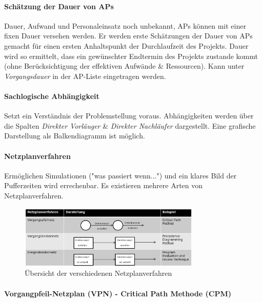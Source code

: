 \documentclass[a4paper]{article}
\begin{document}
			\paragraph{Schätzung der Dauer von APs}
			
			Dauer, Aufwand und Personaleinsatz noch unbekannt, APs können mit einer fixen Dauer versehen werden.
			Er werden erste Schätzungen der Dauer von APs gemacht für einen ersten Anhaltspunkt der Durchlaufzeit des Projekts.
			Dauer wird so ermittelt, dass ein gewünschter Endtermin des Projekts zustande kommt (ohne Berücksichtigung der effektiven Aufwände \& Ressourcen).
			Kann unter \textit{Vorgangsdauer} in der AP-Liste eingetragen werden.
			
			\paragraph{Sachlogische Abhängigkeit}
			
			Setzt ein Verständnis der Problemstellung voraus.
			Abhängigkeiten werden über die Spalten \textit{Direkter Vorläuger} \& \textit{Direkter Nachläufer} dargestellt.
			Eine grafische Darstellung als Balkendiagramm ist möglich.
			
			\paragraph{Netzplanverfahren}
			
			Ermöglichen Simulationen ("was passiert wenn...") und ein klares Bild der Pufferzeiten wird errechenbar.
			Es existieren mehrere Arten von Netzplanverfahren.
			
			\begin{figure}[!htb]
				\centering
				\includegraphics[height=3cm]{img/pm/netzplanverfahren.png}
				\caption{Übersicht der verschiedenen Netzplanverfahren}
				\label{fig:pm_netzplanverfahren}
			\end{figure}
		
			\paragraph{Vorgangpfeil-Netzplan (VPN) - Critical Path Methode (CPM)}
			
\end{document}
